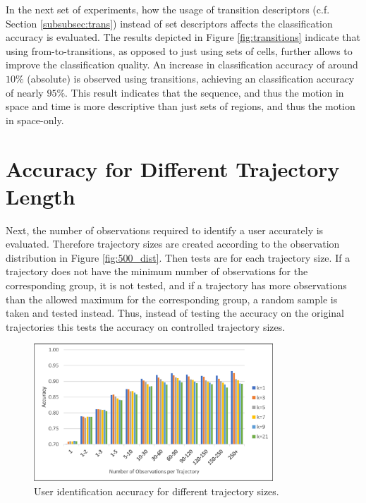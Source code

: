 In the next set of experiments, how the usage of transition descriptors (c.f. Section \ref{subsubsec:trans}) instead of set descriptors affects the classification accuracy is evaluated. The results depicted in Figure \ref{fig:transitions} indicate that using from-to-transitions, as opposed to just using sets of cells, further allows to improve the classification quality. An increase in classification accuracy of around $10\%$ (absolute) is observed using transitions, achieving an classification accuracy of nearly $95\%$. This result indicates that the sequence, and thus the motion in space and time is more descriptive than just sets of regions, and thus the motion in space-only.

\section{Accuracy for Different Trajectory Length}
Next, the number of observations required to identify a user accurately is evaluated. Therefore trajectory sizes are created according to the observation distribution in Figure \ref{fig:500_dist}. Then tests are for each trajectory size. If a trajectory does not have the minimum number of observations for the corresponding group, it is not tested, and if a trajectory has more observations than the allowed maximum for the corresponding group, a random sample is taken and tested instead. Thus, instead of testing the accuracy on the original trajectories this tests the accuracy on controlled trajectory sizes.

\begin{figure}[t]
	\centering
	\includegraphics[width = 0.8\textwidth]{figures/archetype_compare}
  \caption{User identification accuracy for different trajectory sizes.}
  \label{fig:archetype}
	\figSpace
\end{figure}

